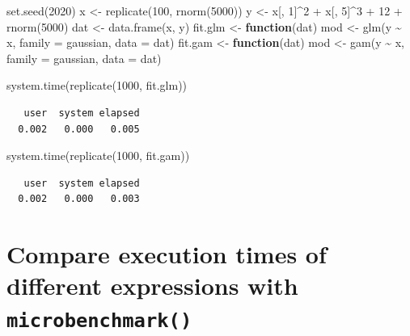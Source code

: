 \documentclass[
]{book}
\newenvironment{Shaded}{\begin{snugshade}}{\end{snugshade}}
\newcommand{\AttributeTok}[1]{\textcolor[rgb]{0.77,0.63,0.00}{#1}}
\newcommand{\ControlFlowTok}[1]{\textcolor[rgb]{0.13,0.29,0.53}{\textbf{#1}}}
\newcommand{\DecValTok}[1]{\textcolor[rgb]{0.00,0.00,0.81}{#1}}
\newcommand{\FunctionTok}[1]{\textcolor[rgb]{0.00,0.00,0.00}{#1}}
\newcommand{\NormalTok}[1]{#1}
\newcommand{\OtherTok}[1]{\textcolor[rgb]{0.56,0.35,0.01}{#1}}
\newcommand{\SpecialCharTok}[1]{\textcolor[rgb]{0.00,0.00,0.00}{#1}}
\begin{document}
\begin{Shaded}
\begin{Highlighting}[]
\FunctionTok{set.seed}\NormalTok{(}\DecValTok{2020}\NormalTok{)}
\NormalTok{x }\OtherTok{\textless{}{-}} \FunctionTok{replicate}\NormalTok{(}\DecValTok{100}\NormalTok{, }\FunctionTok{rnorm}\NormalTok{(}\DecValTok{5000}\NormalTok{))}
\NormalTok{y }\OtherTok{\textless{}{-}}\NormalTok{ x[, }\DecValTok{1}\NormalTok{]}\SpecialCharTok{\^{}}\DecValTok{2} \SpecialCharTok{+}\NormalTok{ x[, }\DecValTok{5}\NormalTok{]}\SpecialCharTok{\^{}}\DecValTok{3} \SpecialCharTok{+} \DecValTok{12} \SpecialCharTok{+} \FunctionTok{rnorm}\NormalTok{(}\DecValTok{5000}\NormalTok{)}
\NormalTok{dat }\OtherTok{\textless{}{-}} \FunctionTok{data.frame}\NormalTok{(x, y)}
\NormalTok{fit.glm }\OtherTok{\textless{}{-}} \ControlFlowTok{function}\NormalTok{(dat) mod }\OtherTok{\textless{}{-}} \FunctionTok{glm}\NormalTok{(y }\SpecialCharTok{\textasciitilde{}}\NormalTok{ x, }\AttributeTok{family =}\NormalTok{ gaussian, }\AttributeTok{data =}\NormalTok{ dat)}
\NormalTok{fit.gam }\OtherTok{\textless{}{-}} \ControlFlowTok{function}\NormalTok{(dat) mod }\OtherTok{\textless{}{-}} \FunctionTok{gam}\NormalTok{(y }\SpecialCharTok{\textasciitilde{}}\NormalTok{ x, }\AttributeTok{family =}\NormalTok{ gaussian, }\AttributeTok{data =}\NormalTok{ dat)}
    
\FunctionTok{system.time}\NormalTok{(}\FunctionTok{replicate}\NormalTok{(}\DecValTok{1000}\NormalTok{, fit.glm))}
\end{Highlighting}
\end{Shaded}

\begin{verbatim}
   user  system elapsed 
  0.002   0.000   0.005 
\end{verbatim}

\begin{Shaded}
\begin{Highlighting}[]
\FunctionTok{system.time}\NormalTok{(}\FunctionTok{replicate}\NormalTok{(}\DecValTok{1000}\NormalTok{, fit.gam))}
\end{Highlighting}
\end{Shaded}

\begin{verbatim}
   user  system elapsed 
  0.002   0.000   0.003 
\end{verbatim}

\hypertarget{compare-execution-times-of-different-expressions-with-microbenchmark}{%
\section{\texorpdfstring{Compare execution times of different expressions with \texttt{microbenchmark()}}{Compare execution times of different expressions with microbenchmark()}}\label{compare-execution-times-of-different-expressions-with-microbenchmark}}
\end{document}
